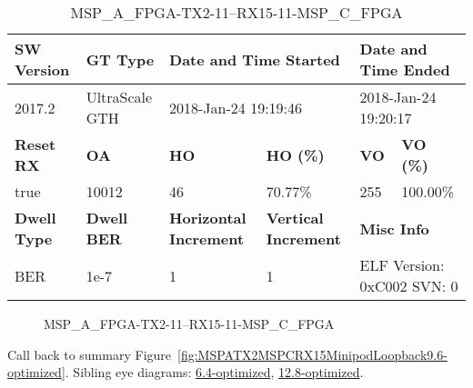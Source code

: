 \begin{table}[h]
\centering
\caption{MSP\_A\_FPGA-TX2-11--RX15-11-MSP\_C\_FPGA}
\label{tab:MSPAFPGATX211RX1511MSPCFPGA9.6-optimized}
\begin{tabular}{@{}|l|l|l|l|l|l|@{}}
\toprule
\textbf{SW Version}                & \textbf{GT Type}   & \multicolumn{2}{l|}{\textbf{Date and Time Started}}            & \multicolumn{2}{l|}{\textbf{Date and Time Ended}}        \\ \midrule
2017.2                       & UltraScale GTH          & \multicolumn{2}{l|}{2018-Jan-24 19:19:46}                   & \multicolumn{2}{l|}{2018-Jan-24 19:20:17}               \\ \midrule
\textbf{Reset RX}                  & \textbf{OA} & \textbf{HO}   & \textbf{HO (\%)} & \textbf{VO} & \textbf{VO (\%)} \\ \midrule
true & 10012        & 46          & 70.77\%        & 255        & 100.00\%       \\ \midrule
\textbf{Dwell Type}                & \textbf{Dwell BER} & \textbf{Horizontal Increment} & \textbf{Vertical Increment}    & \multicolumn{2}{l|}{\textbf{Misc Info}}                  \\ \midrule
BER                            & 1e-7        & 1        & 1           & \multicolumn{2}{l|}{ELF Version: 0xC002 SVN: 0}                         \\ \bottomrule
\end{tabular}
\end{table}

\begin{figure}[h]
\caption{MSP\_A\_FPGA-TX2-11--RX15-11-MSP\_C\_FPGA} \label{fig:MSPAFPGATX211RX1511MSPCFPGA9.6-optimized}
\end{figure}

Call back to summary Figure~\ref{fig:MSPATX2MSPCRX15MinipodLoopback9.6-optimized}.
Sibling eye diagrams: \hyperref[sec:MSPAFPGATX211RX1511MSPCFPGA6.4-optimized]{6.4-optimized}, \hyperref[sec:MSPAFPGATX211RX1511MSPCFPGA12.8-optimized]{12.8-optimized}.

\clearpage
\newpage


